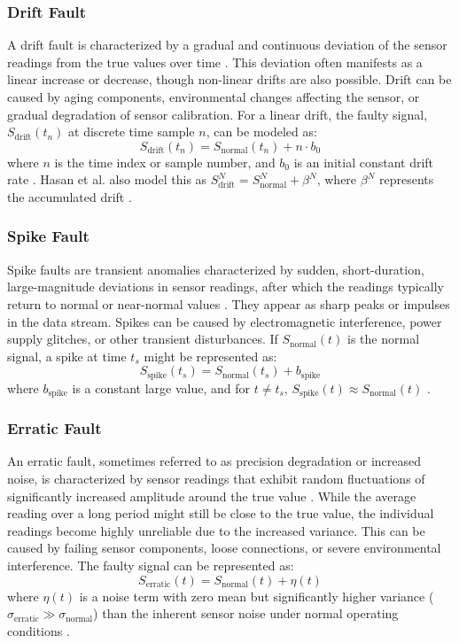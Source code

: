 \subsubsection{Drift Fault}
A drift fault is characterized by a gradual and continuous deviation of the sensor readings from the true values over time \cite{Saeed2021, Hasan2024}. This deviation often manifests as a linear increase or decrease, though non-linear drifts are also possible. Drift can be caused by aging components, environmental changes affecting the sensor, or gradual degradation of sensor calibration. For a linear drift, the faulty signal, \(S_\text{drift}(t_n)\) at discrete time sample \(n\), can be modeled as:
\[S_\text{drift}(t_n) = S_\text{normal}(t_n) + n \cdot b_0\]
where \(n\) is the time index or sample number, and \(b_0\) is an initial constant drift rate \cite{Saeed2021}. Hasan et al. also model this as \(S_\text{drift}^N = S_\text{normal}^N +\beta^N\), where \(\beta^N\) represents the accumulated drift \cite{Hasan2024}.

\subsubsection{Spike Fault}
Spike faults are transient anomalies characterized by sudden, short-duration, large-magnitude deviations in sensor readings, after which the readings typically return to normal or near-normal values \cite{Saeed2021, Shi2024}. They appear as sharp peaks or impulses in the data stream. Spikes can be caused by electromagnetic interference, power supply glitches, or other transient disturbances. If \(S_\text{normal}(t)\) is the normal signal, a spike at time \(t_s\) might be represented as:
\[S_\text{spike}(t_s) = S_\text{normal}(t_s) + b_\text{spike}\]
where \(b_\text{spike}\) is a constant large value, and for \(t \neq t_s\), \(S_\text{spike}(t) \approx S_\text{normal}(t)\) \cite{Saeed2021, Shi2024}.

\subsubsection{Erratic Fault}
An erratic fault, sometimes referred to as precision degradation or increased noise, is characterized by sensor readings that exhibit random fluctuations of significantly increased amplitude around the true value \cite{Saeed2021}. While the average reading over a long period might still be close to the true value, the individual readings become highly unreliable due to the increased variance. This can be caused by failing sensor components, loose connections, or severe environmental interference. The faulty signal can be represented as:
\[S_\text{erratic}(t) = S_\text{normal}(t) + \eta(t)\]
where \(\eta(t)\) is a noise term with zero mean but significantly higher variance (\(\sigma_\text{erratic} \gg \sigma_\text{normal}\)) than the inherent sensor noise under normal operating conditions \cite{Saeed2021}.

